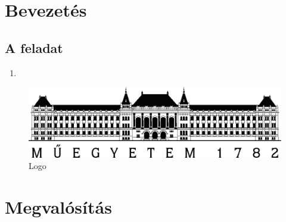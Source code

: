 
\section{Bevezetés}
\subsection{A feladat}
\begin{enumerate}
\item 

\end{enumerate}
\begin{figure}[h]
\vspace{0.5cm}
\begin{center}
\includegraphics[width=400pt,keepaspectratio]{figures/BMElogo.png}
\caption{Logo}
\label{fig:bme}
\end{center}
\vspace{0.5cm}
\end{figure}
\clearpage
\section{Megvalósítás}

\begin{lstlisting}[frame=single,language=matlab,caption={Code},captionpos=b,label={lst:code}]


\end{lstlisting}